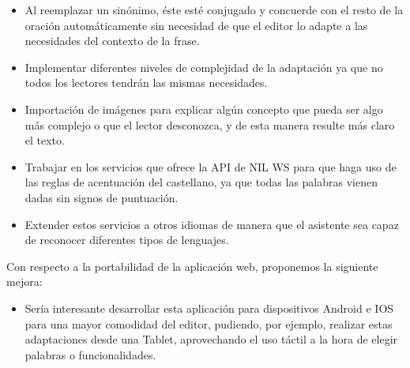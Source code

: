 \begin{itemize}
	\item	Al reemplazar un sinónimo, éste esté conjugado y concuerde con el resto de la oración automáticamente sin necesidad de que el editor lo adapte a las necesidades del contexto de la frase.
		\item	Implementar diferentes niveles de complejidad de la adaptación ya que no todos los lectores tendrán las mismas necesidades.
	\item Importación de imágenes para explicar algún concepto que pueda ser algo más complejo o que el lector desconozca, y de esta manera resulte más claro el texto.
	\item	Trabajar en los servicios que ofrece la API de NIL WS para que haga uso de las reglas de acentuación del castellano, ya que todas las palabras vienen dadas sin signos de puntuación.
	\item	Extender estos servicios a otros idiomas de manera que el asistente sea capaz de reconocer diferentes tipos de lenguajes.
\end{itemize}	
Con respecto a la portabilidad de la aplicación web, proponemos la siguiente mejora:
\begin{itemize}
	\item	Sería interesante desarrollar esta aplicación para dispositivos Android e IOS para una mayor comodidad del editor, pudiendo, por ejemplo, realizar estas adaptaciones desde una Tablet, aprovechando el uso táctil a la hora de elegir palabras o funcionalidades.

\end{itemize}

